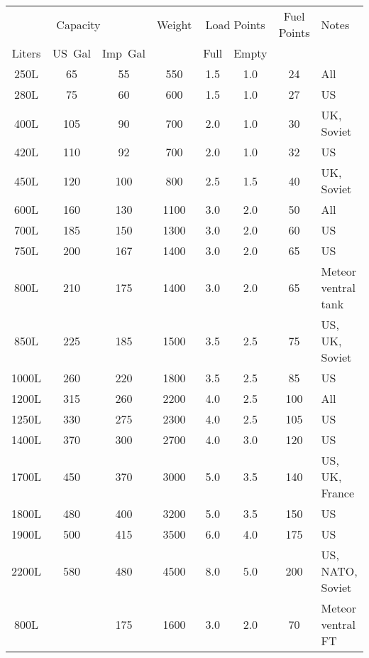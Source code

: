 \begin{twocolumntablefloat}
\begin{twocolumntable}
{
\begin{tabular}{cccccccl}
\toprule
\multicolumn{3}{c}{Capacity}&
Weight&
\multicolumn{2}{c}{Load Points}&
Fuel Points&
Notes\\
\cmidrule{1-3}
\cmidrule{5-6}
Liters&US~Gal&Imp~Gal&&Full&Empty&&\\
\midrule
\phantom{0}250L&\phantom{0}65&\phantom{0}55&\phantom{0}550&1.5&1.0&\phantom{0}24&All\\
\phantom{0}280L&\phantom{0}75&\phantom{0}60&\phantom{0}600&1.5&1.0&\phantom{0}27&US\\
\phantom{0}400L&\phantom{}105&\phantom{0}90&\phantom{0}700&2.0&1.0&\phantom{0}30&UK, Soviet\\
\phantom{0}420L&\phantom{}110&\phantom{0}92&\phantom{0}700&2.0&1.0&\phantom{0}32&US\\
\phantom{0}450L&\phantom{}120&\phantom{}100&\phantom{0}800&2.5&1.5&\phantom{0}40&UK, Soviet\\
\phantom{0}600L&\phantom{}160&\phantom{0}130&\phantom{}1100&3.0&2.0&\phantom{0}50&All\\
\phantom{0}700L&\phantom{}185&\phantom{0}150&\phantom{}1300&3.0&2.0&\phantom{0}60&US\\
\phantom{0}750L&\phantom{}200&\phantom{0}167&\phantom{}1400&3.0&2.0&\phantom{0}65&US\\
\phantom{0}800L&\phantom{}210&\phantom{0}175&\phantom{}1400&3.0&2.0&\phantom{0}65&Meteor ventral tank\\
\phantom{0}850L&\phantom{}225&\phantom{0}185&\phantom{}1500&3.5&2.5&\phantom{0}75&US, UK, Soviet\\
\phantom{}1000L&\phantom{}260&\phantom{0}220&\phantom{}1800&3.5&2.5&\phantom{0}85&US\\
\phantom{}1200L&\phantom{}315&\phantom{0}260&\phantom{}2200&4.0&2.5&\phantom{}100&All\\
\phantom{}1250L&\phantom{}330&\phantom{0}275&\phantom{}2300&4.0&2.5&\phantom{}105&US\\
\phantom{}1400L&\phantom{}370&\phantom{0}300&\phantom{}2700&4.0&3.0&\phantom{}120&US\\
\phantom{}1700L&\phantom{}450&\phantom{0}370&\phantom{}3000&5.0&3.5&\phantom{}140&US, UK, France\\
\phantom{}1800L&\phantom{}480&\phantom{0}400&\phantom{}3200&5.0&3.5&\phantom{}150&US\\
\phantom{}1900L&\phantom{}500&\phantom{0}415&\phantom{}3500&6.0&4.0&\phantom{}175&US\\
\phantom{}2200L&\phantom{}580&\phantom{0}480&\phantom{}4500&8.0&5.0&\phantom{}200&US, NATO, Soviet\\
\midrule
\phantom{0}800L&\phantom{}&\phantom{0}175&\phantom{}1600&3.0&2.0&\phantom{0}70&Meteor ventral FT\\
\bottomrule
\end{tabular}

}
\end{twocolumntable}
\end{twocolumntablefloat}